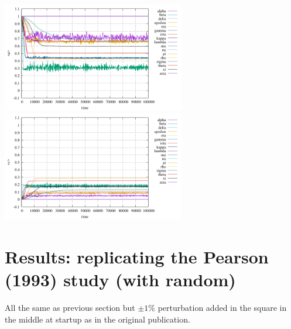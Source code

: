 \includegraphics[width=8cm]{python_codes/fieldstone_171/pearson93/stats_u.pdf}
\includegraphics[width=8cm]{python_codes/fieldstone_171/pearson93/stats_v.pdf}


\newpage
\section*{Results: replicating the Pearson (1993) study (with random)}

All the same as previous section but $\pm 1\%$ perturbation added in the square 
in the middle at startup as in the original publication. 

